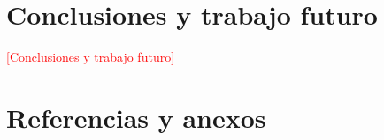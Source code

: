 \documentclass[12pt,a4paper]{article}
\newcounter{none} %
\newcommand{\pendiente}[1]{\textcolor{red}{[#1]}}
\begin{document}
\section{Conclusiones y trabajo futuro}\label{conclusiones}



\pendiente{Conclusiones y trabajo futuro}

\section*{Referencias y anexos}
\label{referencias}

\printbibliography[heading=none]
\end{document}
